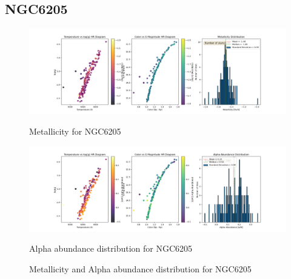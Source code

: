 \documentclass[a4paper,12pt]{article}
\begin{document}
\subsection{NGC6205}
\begin{figure}[H]
    \centering
    \begin{minipage}[b]{0.8\textwidth}
        \centering
        \includegraphics[width=\textwidth]{NGC6205_metalicity.png}
        \caption{Metallicity for NGC6205}
        \label{fig:NGC6205_metalicity}
    \end{minipage}
    \hfill
    \begin{minipage}[b]{0.8\textwidth}
        \centering
        \includegraphics[width=\textwidth]{NGC6205_alpha.png}
        \caption{Alpha abundance distribution for NGC6205}
        \label{fig:NGC6205_alpha}
    \end{minipage}
    \caption{Metallicity and Alpha abundance distribution for NGC6205}
    \label{fig:NGC6205_combined}
\end{figure}
\clearpage
\end{document}
